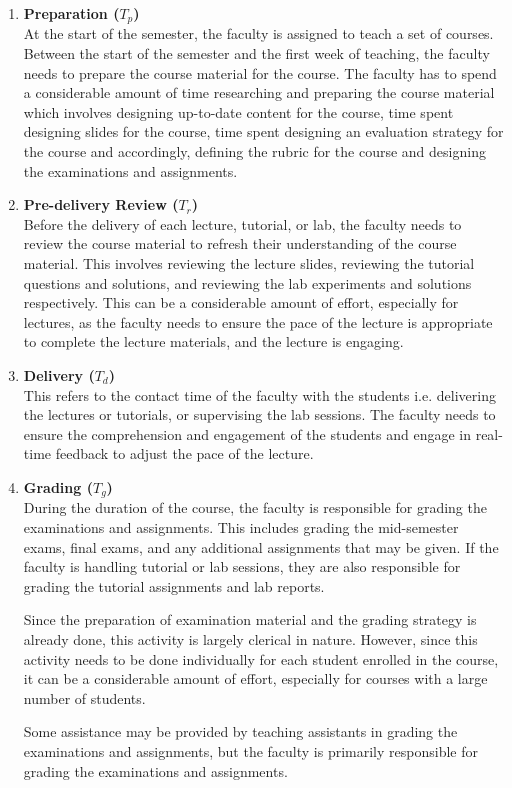 \begin{enumerate}
  \item \textbf{Preparation (\(T_p\))} \\
        At the start of the semester, the faculty is assigned to teach a set of courses. Between the start of the semester and the first week of teaching, the faculty needs to prepare the course material for the course. The faculty has to spend a considerable amount of time researching and preparing the course material which involves designing up-to-date content for the course, time spent designing slides for the course, time spent designing an evaluation strategy for the course and accordingly, defining the rubric for the course and designing the examinations and assignments.

  \item \textbf{Pre-delivery Review (\(T_r\))} \\
        Before the delivery of each lecture, tutorial, or lab, the faculty needs to review the course material to refresh their understanding of the course material. This involves reviewing the lecture slides, reviewing the tutorial questions and solutions, and reviewing the lab experiments and solutions respectively. This can be a considerable amount of effort, especially for lectures, as the faculty needs to ensure the pace of the lecture is appropriate to complete the lecture materials, and the lecture is engaging.

  \item \textbf{Delivery (\(T_d\))} \\
        This refers to the contact time of the faculty with the students i.e. delivering the lectures or tutorials, or supervising the lab sessions. The faculty needs to ensure the comprehension and engagement of the students and engage in real-time feedback to adjust the pace of the lecture.

  \item \textbf{Grading (\(T_g\))} \\
        During the duration of the course, the faculty is responsible for grading the examinations and assignments. This includes grading the mid-semester exams, final exams, and any additional assignments that may be given. If the faculty is handling tutorial or lab sessions, they are also responsible for grading the tutorial assignments and lab reports.

        Since the preparation of examination material and the grading strategy is already done, this activity is largely clerical in nature. However, since this activity needs to be done individually for each student enrolled in the course, it can be a considerable amount of effort, especially for courses with a large number of students.

        Some assistance may be provided by teaching assistants in grading the examinations and assignments, but the faculty is primarily responsible for grading the examinations and assignments.

\end{enumerate}

